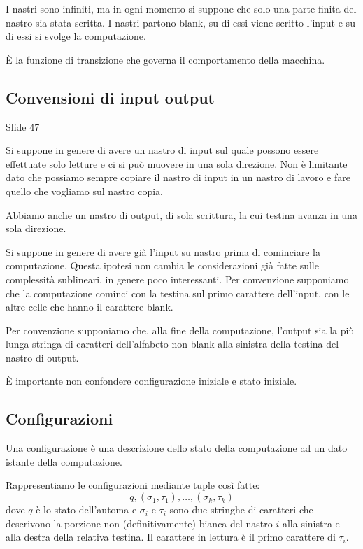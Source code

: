 I nastri sono infiniti, ma in ogni momento si suppone che solo una parte finita del nastro sia stata
scritta. I nastri partono blank, su di essi viene scritto l'input e su di essi si svolge la
computazione.

È la funzione di transizione che governa il comportamento della macchina.

\subsection{Convensioni di input output}

Slide 47

Si suppone in genere di avere un nastro di input sul quale possono essere effettuate solo letture e
ci si può muovere in una sola direzione. Non è limitante dato che possiamo sempre copiare il
nastro di input in un nastro di lavoro e fare quello che vogliamo sul nastro copia.

Abbiamo anche un nastro di output, di sola scrittura, la cui testina avanza in una sola direzione.

Si suppone in genere di avere già l'input su nastro prima di cominciare la computazione.  Questa
ipotesi non cambia le considerazioni già fatte sulle complessità sublineari, in genere poco
interessanti. Per convenzione supponiamo che la computazione cominci con la testina sul primo
carattere dell'input, con le altre celle che hanno il carattere blank.

Per convenzione supponiamo che, alla fine della computazione, l'output sia la più lunga stringa di
caratteri dell'alfabeto non blank alla sinistra della testina del nastro di output.

È importante non confondere configurazione iniziale e stato iniziale.

\subsection{Configurazioni}

Una configurazione è una descrizione dello stato della computazione ad un dato istante della
computazione.

Rappresentiamo le configurazioni mediante tuple così fatte:
\begin{equation*}
    q, (\sigma_{1},\tau_{1}),\dotsc,(\sigma_{k},\tau_{k})
\end{equation*}
dove $q$ è lo stato dell'automa e $\sigma_{i}$ e $\tau_{i}$ sono due stringhe di caratteri che
descrivono la porzione non (definitivamente) bianca del nastro $i$ alla sinistra e alla destra della
relativa testina. Il carattere in lettura è il primo carattere di $\tau_{i}$.


